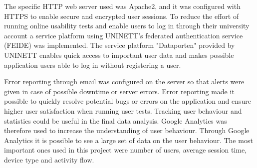The specific HTTP web server used was Apache2, and it was configured with HTTPS to enable secure and encrypted user sessions. To reduce the effort of running online usability tests and enable users to log in through their university account a service platform using UNINETT's federated authentication service (FEIDE) was implemented. The service platform "Dataporten"\cite{dataporten} provided by UNINETT enables quick access to important user data and makes possible application users able to log in without registering a user. 

Error reporting through email was configured on the server so that alerts were given in case of possible downtime or server errors. Error reporting made it possible to quickly resolve potential bugs or errors on the application and ensure higher user satisfaction when running user tests. Tracking user behaviour and statistics could be useful in the final data analysis. Google Analytics was therefore used to increase the understanding of user behaviour. Through Google Analytics it is possible to see a large set of data on the user behaviour. The most important ones used in this project were number of users, average session time, device type and activity flow.  

\cleardoublepage